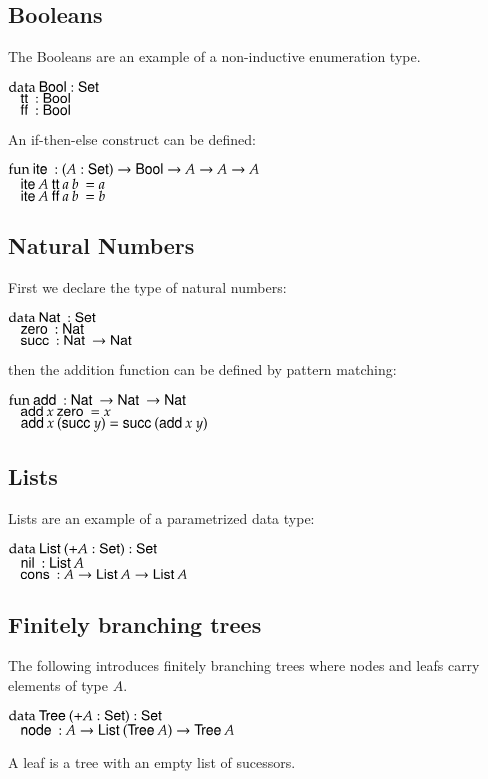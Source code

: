 \subsection{Booleans}
The Booleans are an example of a non-inductive enumeration type.
\begin{bsp}
$\data \Bool : \Set$  \\
$\spc \ttt : \Bool $\\
$\spc \fff : \Bool $
\end{bsp}
An if-then-else construct can be defined:
\begin{bsp}
$\fun \ite : (A : \Set ) \ra \Bool \ra A \ra A \ra A$\\
$\spc \ite A\: \ttt a\: b\: = a$\\
$\spc \ite A\: \fff a\: b\: = b$\\
\end{bsp}
\subsection{Natural Numbers}
First we declare the type of natural numbers:
\begin{bsp}
$\data \Nat : \Set$ \\
$\spc \zero : \Nat $\\
$\spc \suc : \Nat \ra \Nat$
\end{bsp}
then the addition function can be defined by pattern matching:
\begin{bsp}
$\fun \add : \Nat \ra \Nat \ra \Nat$\\
$\spc \add x \: \zero = x $\\
$\spc \add x \: (\suc y) = \suc (\add x \: y)  $
\end{bsp}
\subsection{Lists}
Lists are an example of a parametrized data type:
\begin{bsp}
$\data \List ( + A : \Set ) : \Set $ \\
$ \spc \nil : \List A  $\\
$ \spc \cons : A \ra \List A \ra \List A $
\end{bsp}
\subsection{Finitely branching trees}
\label{tre}
The following introduces finitely branching trees where nodes and leafs carry elements of type $A$.
\begin{bsp}
$\data \Tree ( + A : \Set ) : \Set $ \\
$ \spc \node : A \ra \List (\Tree A ) \ra \Tree A  $
\end{bsp}
A leaf is a tree with an empty list of sucessors. 

